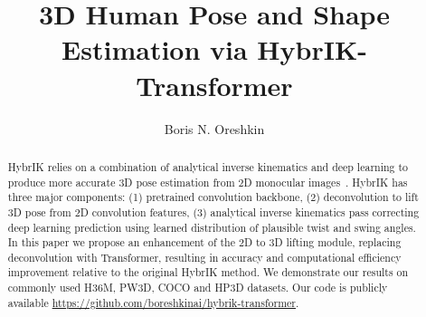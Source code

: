 \documentclass[sigconf,final]{acmart}
\begin{document}
\title{3D Human Pose and Shape Estimation via HybrIK-Transformer}

\author{Boris N. Oreshkin}





\begin{abstract}
HybrIK relies on a combination of analytical inverse kinematics and deep learning to produce more accurate 3D pose estimation from 2D monocular images~\cite{li2021hybrik}. HybrIK has three major components: (1) pretrained convolution backbone, (2) deconvolution to lift 3D pose from 2D convolution features, (3) analytical inverse kinematics pass correcting deep learning prediction using learned distribution of plausible twist and swing angles. In this paper we propose an enhancement of the 2D to 3D lifting module, replacing deconvolution with Transformer, resulting in accuracy and computational efficiency improvement relative to the original HybrIK method. We demonstrate our results on commonly used H36M, PW3D, COCO and HP3D datasets. Our code is publicly available \url{https://github.com/boreshkinai/hybrik-transformer}.
\end{abstract}


\maketitle
\end{document}
